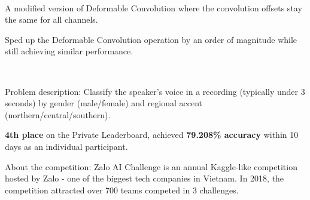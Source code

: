 \\
\begin{zitemize}
    \item A modified version of Deformable Convolution where the convolution offsets
    stay the same for all channels.
    \item Sped up the Deformable Convolution operation by an order of magnitude while still achieving similar performance.
\end{zitemize}

\\
\begin{zitemize}
    \item Problem description: Classify the speaker's voice in a recording (typically
    under 3 seconds) by gender (male/female) and regional accent (northern/central/southern).
    \item \textbf{4th place} on the Private Leaderboard, achieved \textbf{79.208\%
        accuracy} within 10 days as an individual participant.
    \item About the competition: Zalo AI Challenge is an annual Kaggle-like competition hosted
    by Zalo - one of the biggest tech companies in Vietnam. In 2018, the competition attracted
    over 700 teams competed in 3 challenges.
\end{zitemize}




